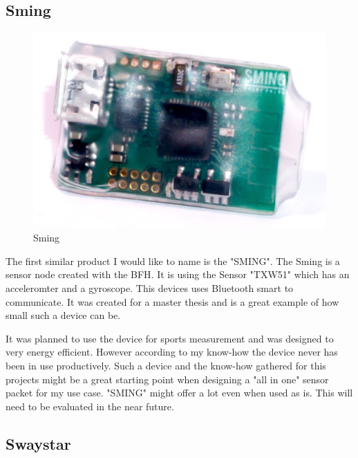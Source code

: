 \subsection{Sming}

\begin{figure}
  \begin{center}
\includegraphics[width=\linewidth]{images/sming_pic2.jpg}
  \end{center}
  \caption{\label{fig:Sming}Sming \cite{sming:book}}
\end{figure}

The first similar product I would like to name is the "SMING". The Sming is a sensor node created with the BFH. 
It is using the Sensor "TXW51" which has an acceleromter and a gyroscope. This devices uses Bluetooth smart to communicate. It was created for a master thesis and is a great example of how small such a device can be. 

It was planned to use the device for sports measurement and was designed to very energy efficient. However according to my know-how the device never has been in use productively. \cite{sming:book}
Such a device and the know-how gathered for this projects might be a great starting point when designing a "all in one" sensor packet for my use case. "SMING" might offer a lot even when used as is. This will need to be evaluated in the near future.

\subsection{Swaystar}

